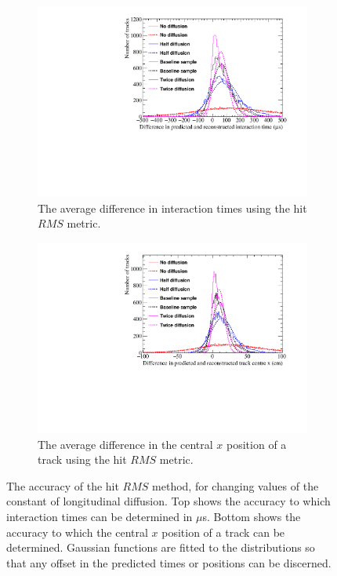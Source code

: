 
\begin{figure}
  \centering
  \begin{subfigure}{0.6\textwidth}
    \centering
    \includegraphics[width=\textwidth]{Canvas_AvDiff_T_RMS_Diffusion}
    \caption{The average difference in interaction times using the hit $RMS$ metric.}
    \label{fig:DiffLDiff_AvDiffRMS_T}
  \end{subfigure}
  \begin{subfigure}{0.6\textwidth}
    \centering
    \includegraphics[width=\textwidth]{Canvas_AvDiff_X_RMS_Diffusion}
    \caption{The average difference in the central $x$ position of a track using the hit $RMS$ metric.}
    \label{fig:DiffLDiff_AvDiffRMS_X}
  \end{subfigure}
  \caption[Comparing the accuracy of the hit $RMS$ method, as the constant of longitudinal diffusion changes]
          {The accuracy of the hit $RMS$ method, for changing values of the constant of longitudinal diffusion. Top shows the accuracy to which interaction times can be determined in $\mu$s. Bottom shows the accuracy to which the central $x$ position of a track can be determined. Gaussian functions are fitted to the distributions so that any offset in the predicted times or positions can be discerned.}
  \label{fig:DiffLDiff_AvDiff_RMS}
\end{figure}

